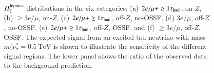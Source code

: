 \begin{figure}[htbp]
{    
  }
  \hfill
	\caption{$H_{\mathrm{T}}^{\mathrm{leptons}}$ distributions in the six categories: (a) $2e/\mu+\geq1\tau_\mathrm{had}$, on-$Z$, (b) $\geq3e/\mu$, on-$Z$, (c) $2e/\mu+\geq1\tau_\mathrm{had}$, off-$Z$, no-OSSF, (d) $3e/\mu$, off-$Z$, no-OSSF, (e) $2e/\mu+\geq1\tau_\mathrm{had}$, off-$Z$, OSSF, and (f) $\geq3e/\mu$, off-$Z$, OSSF. The expected signal from an excited tau neutrino with mass $m(\nu^{*}_{\tau}=\SI{0.5}{\tera\electronvolt}$ is shown to illustrate the sensitivity of the different signal regions. The lower panel shows the ratio of the observed data to the background prediction.}
	\label{fig:model-independent-htlep}
\end{figure}

